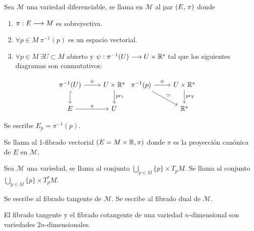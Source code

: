 \begin{definition}
  Sea $\mathcal{M}$ una variedad diferenciable, se llama  en $\mathcal{M}$ al
  par $(E,\thinspace \pi)$ donde
  \begin{enumerate}
    \item $\pi:E\longrightarrow M$ es sobreyectiva.
    \item $\forall p\in M\ \pi^{-1}(p)$ es un espacio vectorial.
    \item $\forall p\in M\ \exists U\subset M$ abierto y $\psi:\pi^{-1}(U)\longrightarrow U\times\mathbb{R}^s$ tal que los siguientes diagramas son conmutativos:
  \end{enumerate}


  \[
    \begin{tikzcd}
      \pi^{-1}(U)\arrow{r}{\psi}\arrow[hook]{d} & U\times\R^s\arrow{d}{pr_1}\\
      E\arrow{r}{\pi} & U
    \end{tikzcd}
    \begin{tikzcd}
      \pi^{-1}(p)\arrow{r}{\psi}\arrow{dr}{\simeq} & U\times\R^s\arrow{d}{pr_2}\\
       & \R^s
    \end{tikzcd}
  \]
\end{definition}
\begin{notation}
  Se escribe $E_p=\pi^{-1}(p)$.
\end{notation}

\begin{definition}
Se llama  al 1-fibrado vectorial $(E=M\times\mathbb{R},\pi)$ donde
$\pi$
es la proyección canónica de $E$ en $\mathcal{M}$.
\end{definition}

\begin{definition}
  Sea $\mathcal{M}$ una variedad, se llama  al conjunto $\bigcup_{p\in M}\{p\}\times T_pM$.
  Se llama  al conjunto $\bigcup_{p\in M}\{p\}\times T^*_pM$.
\end{definition}
\begin{notation}
  Se escribe  al fibrado tangente de $\mathcal{M}$.
  Se escribe  al fibrado dual de $\mathcal{M}$.
\end{notation}

\begin{exercise}
  El fibrado tangente y el fibrado cotangente de una variedad $n$-dimensional son variedades $2n$-dimensionales.
\end{exercise}

